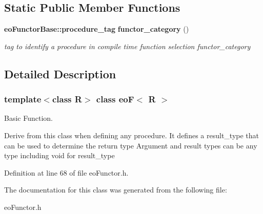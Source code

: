 \subsection*{Static Public Member Functions}
\begin{CompactItemize}
\item 
{\bf eo\-Functor\-Base::procedure\_\-tag} {\bf functor\_\-category} ()\label{classeo_f_e0}

\begin{CompactList}\small\item\em tag to identify a procedure in compile time function selection functor\_\-category \item\end{CompactList}\end{CompactItemize}


\subsection{Detailed Description}
\subsubsection*{template$<$class R$>$ class eo\-F$<$ R $>$}

Basic Function. 

Derive from this class when defining any procedure. It defines a result\_\-type that can be used to determine the return type Argument and result types can be any type including void for result\_\-type 



Definition at line 68 of file eo\-Functor.h.

The documentation for this class was generated from the following file:\begin{CompactItemize}
\item 
eo\-Functor.h\end{CompactItemize}
